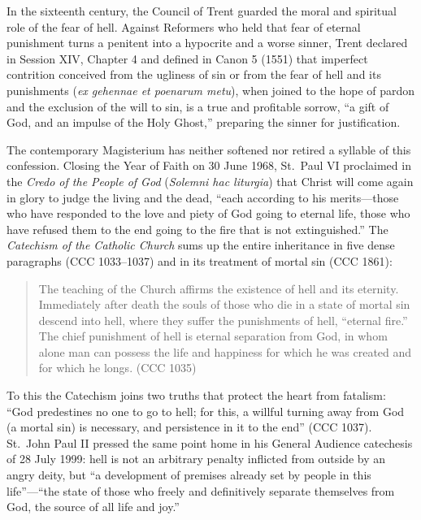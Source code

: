 In the sixteenth century, the Council of Trent guarded the moral and spiritual role of the fear of hell. Against Reformers who held that fear of eternal punishment turns a penitent into a hypocrite and a worse sinner, Trent declared in Session XIV, Chapter 4 and defined in Canon 5 (1551) that imperfect contrition conceived from the ugliness of sin or from the fear of hell and its punishments (\textit{ex gehennae et poenarum metu}), when joined to the hope of pardon and the exclusion of the will to sin, is a true and profitable sorrow, ``a gift of God, and an impulse of the Holy Ghost,'' preparing the sinner for justification.

The contemporary Magisterium has neither softened nor retired a syllable of this confession. Closing the Year of Faith on 30 June 1968, St.\ Paul VI proclaimed in the \textit{Credo of the People of God} (\textit{Solemni hac liturgia}) that Christ will come again in glory to judge the living and the dead, ``each according to his merits---those who have responded to the love and piety of God going to eternal life, those who have refused them to the end going to the fire that is not extinguished.'' The \textit{Catechism of the Catholic Church} sums up the entire inheritance in five dense paragraphs (CCC 1033--1037) and in its treatment of mortal sin (CCC 1861):

\begin{quote}
The teaching of the Church affirms the existence of hell and its eternity. Immediately after death the souls of those who die in a state of mortal sin descend into hell, where they suffer the punishments of hell, ``eternal fire.'' The chief punishment of hell is eternal separation from God, in whom alone man can possess the life and happiness for which he was created and for which he longs. (CCC 1035)
\end{quote}

To this the Catechism joins two truths that protect the heart from fatalism: ``God predestines no one to go to hell; for this, a willful turning away from God (a mortal sin) is necessary, and persistence in it to the end'' (CCC 1037). St.\ John Paul II pressed the same point home in his General Audience catechesis of 28 July 1999: hell is not an arbitrary penalty inflicted from outside by an angry deity, but ``a development of premises already set by people in this life''---``the state of those who freely and definitively separate themselves from God, the source of all life and joy.''


